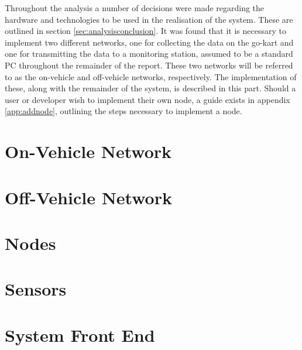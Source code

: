 Throughout the analysis a number of decisions were made regarding the hardware and technologies to be used in the realisation of the system.
These are outlined in section \ref{sec:analysisconclusion}.
It was found that it is necessary to implement two different networks, one for collecting the data on the go-kart and one for transmitting the data to a monitoring station, assumed to be a standard PC throughout the remainder of the report.
These two networks will be referred to as the on-vehicle and off-vehicle networks, respectively.
The implementation of these, along with the remainder of the system, is described in this part.
Should a user or developer wish to implement their own node, a guide exists in appendix \ref{app:addnode}, outlining the steps necessary to implement a node.

\section{On-Vehicle Network}






\section{Off-Vehicle Network}
\label{sec:wifi}

\section{Nodes}

\section{Sensors}

\section{System Front End}
